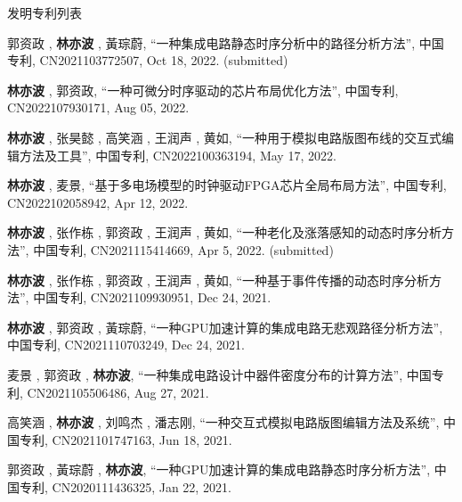 \begin{rSection}{发明专利列表}
\begin{description}[font=\normalfont, rightmargin=2em]
{}
            

\item[{[P10]}]{
        郭资政 ,  \textbf{林亦波} ,  黃琮蔚, 
    ``一种集成电路静态时序分析中的路径分析方法'', 
    中国专利, CN2021103772507, Oct 18, 2022.
    (submitted)
}
            

\item[{[P9]}]{
        \textbf{林亦波} ,  郭资政, 
    ``一种可微分时序驱动的芯片布局优化方法'', 
    中国专利, CN2022107930171, Aug 05, 2022.
    
}
            

\item[{[P8]}]{
        \textbf{林亦波} ,  张昊懿 ,  高笑涵 ,  王润声 ,  黄如, 
    ``一种用于模拟电路版图布线的交互式编辑方法及工具'', 
    中国专利, CN2022100363194, May 17, 2022.
    
}
            

\item[{[P7]}]{
        \textbf{林亦波} ,  麦景, 
    ``基于多电场模型的时钟驱动FPGA芯片全局布局方法'', 
    中国专利, CN2022102058942, Apr 12, 2022.
    
}
            

\item[{[P6]}]{
        \textbf{林亦波} ,  张作栋 ,  郭资政 ,  王润声 ,  黄如, 
    ``一种老化及涨落感知的动态时序分析方法'', 
    中国专利, CN2021115414669, Apr 5, 2022.
    (submitted)
}
            

\item[{[P5]}]{
        \textbf{林亦波} ,  张作栋 ,  郭资政 ,  王润声 ,  黄如, 
    ``一种基于事件传播的动态时序分析方法'', 
    中国专利, CN2021109930951, Dec 24, 2021.
    
}
            

\item[{[P4]}]{
        \textbf{林亦波} ,  郭资政 ,  黃琮蔚, 
    ``一种GPU加速计算的集成电路无悲观路径分析方法'', 
    中国专利, CN2021110703249, Dec 24, 2021.
    
}
            

\item[{[P3]}]{
        麦景 ,  郭资政 ,  \textbf{林亦波}, 
    ``一种集成电路设计中器件密度分布的计算方法'', 
    中国专利, CN2021105506486, Aug 27, 2021.
    
}
            

\item[{[P2]}]{
        高笑涵 ,  \textbf{林亦波} ,  刘鸣杰 ,  潘志刚, 
    ``一种交互式模拟电路版图编辑方法及系统'', 
    中国专利, CN2021101747163, Jun 18, 2021.
    
}
            

\item[{[P1]}]{
        郭资政 ,  黃琮蔚 ,  \textbf{林亦波}, 
    ``一种GPU加速计算的集成电路静态时序分析方法'', 
    中国专利, CN2020111436325, Jan 22, 2021.
    
}
            

\end{description}
    

\end{rSection}


